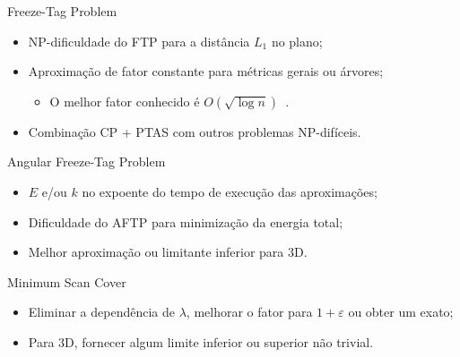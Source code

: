 \subseqslide

\begin{frame}{Freeze-Tag Problem}
  \begin{itemize}[<+->]

    \item NP-dificuldade do FTP para a distância $L_1$ no plano;

    \item Aproximação de fator constante para métricas gerais ou árvores;

    \begin{itemize}[<+->]
        \item O melhor fator conhecido é $O(\sqrt{\log n})$~\cite{Kne05}.
    \end{itemize}

    \item Combinação CP + PTAS com outros problemas NP-difíceis.

  \end{itemize}
\end{frame}

\begin{frame}{Angular Freeze-Tag Problem}
  \begin{itemize}[<+->]

    \item $E$ e/ou $k$ no expoente do tempo de execução das aproximações;

    \item Dificuldade do AFTP para minimização da energia total;

    \item Melhor aproximação ou limitante inferior para 3D.

  \end{itemize}
\end{frame}

\begin{frame}{Minimum Scan Cover}
  \begin{itemize}[<+->]

    \item Eliminar a dependência de $\lambda$, melhorar o fator para $1+\varepsilon$ ou obter um \FPT exato;

    \item Para 3D, fornecer algum limite inferior ou superior não trivial.

  \end{itemize}
\end{frame}
